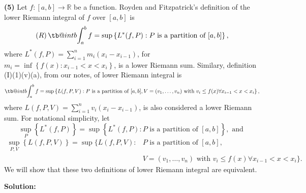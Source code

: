 \documentclass[12pt]{article}
\makeatletter
\newcommand\bint{\mathop{\mathpalette\tb@int{b}}\!\int}
\newcommand\tb@int[2]{%
  \sbox\z@{$\m@th#1\int$}%
  \if#2t%
    \rlap{\hbox to\wd\z@{%
      \hfil
      \vrule width .35em height \dimexpr\ht\z@+1.4pt\relax depth -\dimexpr\ht\z@+1pt\relax
      \kern.05em %
    }}
  \else
    \rlap{\hbox to\wd\z@{%
      \vrule width .35em height -\dimexpr\dp\z@+1pt\relax depth \dimexpr\dp\z@+1.4pt\relax
      \hfil
    }}
  \fi
}
\makeatother
\begin{document}
{\bf (5)} Let $f: [a,b] \rightarrow \mathbb{R}$ be a function. Royden and Fitzpatrick's definition of the lower Riemann integral of $f$ over $[a,b]$
is 
\[ (R)\bint_{a}^{b} f = \sup\left\{ L^{*}(f,P) : P\text{ is a partition of }[a,b] \right\}, \]
where $L^{*}(f,P) = \sum_{i=1}^{n}m_{i}(x_{i} - x_{i-1})$, for $m_{i} = \inf\left\{ f(x) : x_{i-1} < x < x_{i} \right\}$, is a lower Riemann sum. Similary,
definition (I)(1)(v)(a), from our notes, of lower Riemann integral is 
\[ \bint_{a}^{b}f = \sup\left\{ L(f, P, V) : P\text{ is a partition of }[a,b], V = (v_{1}, \dots, v_{n})\text{ with }v_{i} \leq f(x)\forall x_{i-1} <
x < x_{i} \right\}, \]
where $L(f,P,V) = \sum_{i=1}^{n}v_{i}(x_{i} - x_{i-1})$, is also considered a lower Riemann sum. For notational simplicity, let 
\[ \sup_{P}\left\{ L^{*}(f,P) \right\} =\sup\left\{ L^{*}(f,P) : P\text{ is a partition of }[a,b] \right\}, \text{ and } \]
\begin{align*}
\sup_{P, V}\left\{ L(f,P,V) \right\} = \sup\big\{ L(f, P, V) :& P\text{ is a partition of }[a,b], \\
\qquad & V = (v_{1}, \dots, v_{n})\text{ with }v_{i} \leq f(x)\forall x_{i-1} < x < x_{i} \big\}.
\end{align*}
We will show that these two definitions of lower Riemann integral are equivalent.

{\bf Solution:}
\end{document}
